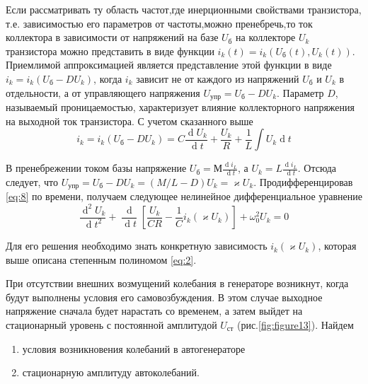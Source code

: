 Если рассматривать ту область частот,где инерционными свойствами транзистора, т.е. зависимостью его параметров от частоты,можно пренебречь,то ток коллектора в зависимости от напряжений на базе $U_\text{б}$ на коллекторе $U_k$ транзистора можно представить в виде функции $i_k(t)=i_k(U_\text{б}(t),U_k(t))$. Приемлимой аппроксимацией является представление этой функции в виде $i_k=i_k(U_\text{б}-DU_k)$, когда $i_k$ зависит не от каждого из напряжений $U_\text{б}$ и $U_k$ в отдельности, а от управляющего напряжения $U_\text{упр}=U_\text{б}-DU_k$. Параметр $D$, называемый проницаемостью, характеризует влияние коллекторного напряжения на выходной ток транзистора. С учетом сказанного выше
\begin{equation}
i_k=i_k(U_\text{б}-DU_k)=C\frac{\operatorname dU_k}{\operatorname dt}+\frac{U_k}{R}+\frac{1}{L}\int U_k \operatorname dt
\label{eq:8}
\end{equation}{}

В пренебрежении током базы напряжение $\displaystyle U_\text{б}=М\frac{\operatorname di_L}{\operatorname dt}$, а $\displaystyle U_k=L\frac{\operatorname di_L}{\operatorname dt}$. Отсюда следует, что $U_\text{упр}=U_\text{б}-DU_k=(M/L-D)U_k=\varkappa U_k$. Продифференцировав \eqref{eq:8} по времени, получаем следующее нелинейное дифференциальное уравнение
\begin{equation}
\frac{\operatorname d^2U_k}{\operatorname dt^2}+\frac{\operatorname d}{\operatorname dt}[\frac{U_k}{CR}-\frac{1}{C}i_k(\varkappa U_k)]+\omega_0^2U_k=0
\label{eq:9}
\end{equation}

Для его решения необходимо знать конкретную зависимость $i_k(\varkappa U_k)$, которая выше описана степенным полиномом \eqref{eq:2}. 

При отсутствии внешних возмущений колебания в генераторе возникнут, когда будут выполнены условия его самовозбуждения. В этом случае выходное напряжение сначала будет нарастать со временем, а
затем выйдет на стационарный уровень с постоянной амплитудой $U_\text{ст}$ (рис.\ref{fig:figure13}). Найдем
\begin{enumerate}
\item условия возникновения колебаний в автогенераторе
\item стационарную амплитуду автоколебаний.
\end{enumerate}

